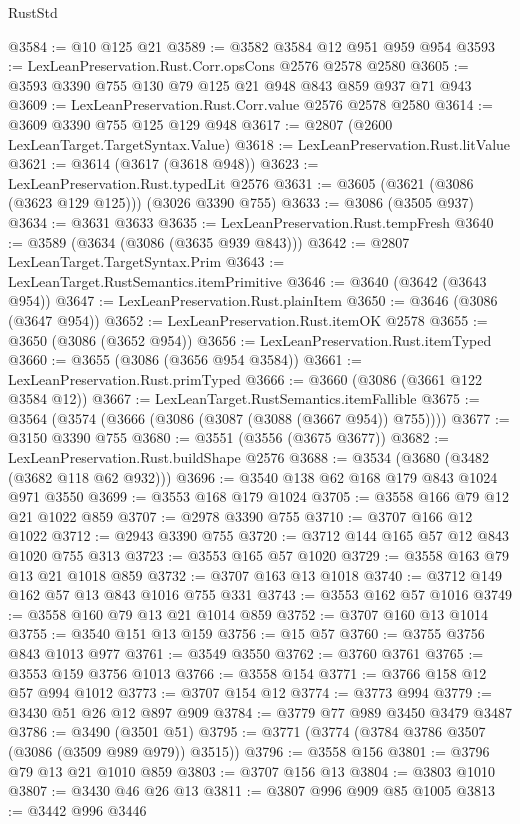 \begin{lexlean}{RustStd}
\begin{coremodule}
@3584 := @10 @125 @21
@3589 := @3582 @3584 @12 @951 @959 @954
@3593 := LexLeanPreservation.Rust.Corr.opsCons @2576 @2578 @2580
@3605 := @3593 @3390 @755 @130 @79 @125 @21 @948 @843 @859 @937 @71 @943
@3609 := LexLeanPreservation.Rust.Corr.value @2576 @2578 @2580
@3614 := @3609 @3390 @755 @125 @129 @948
@3617 := @2807 (@2600 LexLeanTarget.TargetSyntax.Value)
@3618 := LexLeanPreservation.Rust.litValue
@3621 := @3614 (@3617 (@3618 @948))
@3623 := LexLeanPreservation.Rust.typedLit @2576
@3631 := @3605 (@3621 (@3086 (@3623 @129 @125))) (@3026 @3390 @755)
@3633 := @3086 (@3505 @937)
@3634 := @3631 @3633
@3635 := LexLeanPreservation.Rust.tempFresh
@3640 := @3589 (@3634 (@3086 (@3635 @939 @843)))
@3642 := @2807 LexLeanTarget.TargetSyntax.Prim
@3643 := LexLeanTarget.RustSemantics.itemPrimitive
@3646 := @3640 (@3642 (@3643 @954))
@3647 := LexLeanPreservation.Rust.plainItem
@3650 := @3646 (@3086 (@3647 @954))
@3652 := LexLeanPreservation.Rust.itemOK @2578
@3655 := @3650 (@3086 (@3652 @954))
@3656 := LexLeanPreservation.Rust.itemTyped
@3660 := @3655 (@3086 (@3656 @954 @3584))
@3661 := LexLeanPreservation.Rust.primTyped
@3666 := @3660 (@3086 (@3661 @122 @3584 @12))
@3667 := LexLeanTarget.RustSemantics.itemFallible
@3675 := @3564 (@3574 (@3666 (@3086 (@3087 (@3088 (@3667 @954)) @755))))
@3677 := @3150 @3390 @755
@3680 := @3551 (@3556 (@3675 @3677))
@3682 := LexLeanPreservation.Rust.buildShape @2576
@3688 := @3534 (@3680 (@3482 (@3682 @118 @62 @932)))
@3696 := @3540 @138 @62 @168 @179 @843 @1024 @971 @3550
@3699 := @3553 @168 @179 @1024
@3705 := @3558 @166 @79 @12 @21 @1022 @859
@3707 := @2978 @3390 @755
@3710 := @3707 @166 @12 @1022
@3712 := @2943 @3390 @755
@3720 := @3712 @144 @165 @57 @12 @843 @1020 @755 @313
@3723 := @3553 @165 @57 @1020
@3729 := @3558 @163 @79 @13 @21 @1018 @859
@3732 := @3707 @163 @13 @1018
@3740 := @3712 @149 @162 @57 @13 @843 @1016 @755 @331
@3743 := @3553 @162 @57 @1016
@3749 := @3558 @160 @79 @13 @21 @1014 @859
@3752 := @3707 @160 @13 @1014
@3755 := @3540 @151 @13 @159
@3756 := @15 @57
@3760 := @3755 @3756 @843 @1013 @977
@3761 := @3549 @3550
@3762 := @3760 @3761
@3765 := @3553 @159 @3756 @1013
@3766 := @3558 @154
@3771 := @3766 @158 @12 @57 @994 @1012
@3773 := @3707 @154 @12
@3774 := @3773 @994
@3779 := @3430 @51 @26 @12 @897 @909
@3784 := @3779 @77 @989 @3450 @3479 @3487
@3786 := @3490 (@3501 @51)
@3795 := @3771 (@3774 (@3784 @3786 @3507 (@3086 (@3509 @989 @979)) @3515))
@3796 := @3558 @156
@3801 := @3796 @79 @13 @21 @1010 @859
@3803 := @3707 @156 @13
@3804 := @3803 @1010
@3807 := @3430 @46 @26 @13
@3811 := @3807 @996 @909 @85 @1005
@3813 := @3442 @996 @3446

\end{coremodule}
\end{lexlean}
